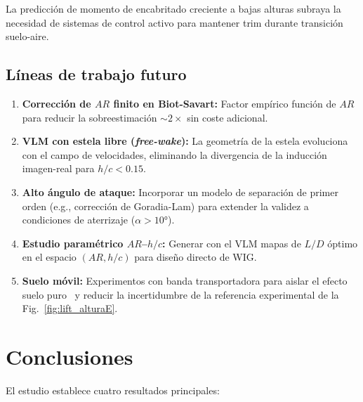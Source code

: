\documentclass[twocolumn]{article}
\begin{document}
La predicción de momento de encabritado creciente a bajas alturas subraya la necesidad de sistemas de control activo para mantener trim durante transición suelo-aire.

\subsection{Líneas de trabajo futuro}

\begin{enumerate}
    \item \textbf{Corrección de $AR$ finito en Biot-Savart:} Factor empírico función de $AR$ para reducir la sobreestimación $\sim 2\times$ sin coste adicional.
    \item \textbf{VLM con estela libre (\textit{free-wake}):} La geometría de la estela evoluciona con el campo de velocidades, eliminando la divergencia de la inducción imagen-real para $h/c < 0.15$.
    \item \textbf{Alto ángulo de ataque:} Incorporar un modelo de separación de primer orden (e.g., corrección de Goradia-Lam) para extender la validez a condiciones de aterrizaje ($\alpha > 10°$).
    \item \textbf{Estudio paramétrico $AR$--$h/c$:} Generar con el VLM mapas de $L/D$ óptimo en el espacio $(AR, h/c)$ para diseño directo de WIG.
    \item \textbf{Suelo móvil:} Experimentos con banda transportadora para aislar el efecto suelo puro~\cite{zerihan2000} y reducir la incertidumbre de la referencia experimental de la Fig.~\ref{fig:lift_alturaE}.
\end{enumerate}

\section{Conclusiones}

El estudio establece cuatro resultados principales:
\end{document}
